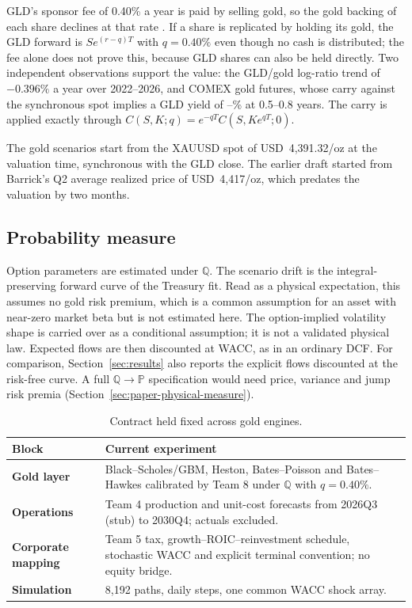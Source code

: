 GLD's sponsor fee of 0.40\% a year is paid by selling gold, so the gold backing of each share declines at that rate \citep{spdr2025}. If a share is replicated by holding its gold, the GLD forward is $S e^{(r-q)T}$ with $q=0.40\%$ even though no cash is distributed; the fee alone does not prove this, because GLD shares can also be held directly. Two independent observations support the value: the GLD/gold log-ratio trend of $-0.396\%$ a year over 2022--2026, and COMEX gold futures, whose carry against the synchronous spot implies a GLD yield of \FuturesYieldLow--\FuturesYieldHigh\% at 0.5--0.8 years. The carry is applied exactly through $C(S,K;q)=e^{-qT}C(S,Ke^{qT};0)$.

The gold scenarios start from the XAUUSD spot of USD~4,391.32/oz at the valuation time, synchronous with the GLD close. The earlier draft started from Barrick's Q2 average realized price of USD~4,417/oz, which predates the valuation by two months.

\subsection{Probability measure}
Option parameters are estimated under $\mathbb Q$. The scenario drift is the integral-preserving forward curve of the Treasury fit. Read as a physical expectation, this assumes no gold risk premium, which is a common assumption for an asset with near-zero market beta but is not estimated here. The option-implied volatility shape is carried over as a conditional assumption; it is not a validated physical law. Expected flows are then discounted at WACC, as in an ordinary DCF. For comparison, Section~\ref{sec:results} also reports the explicit flows discounted at the risk-free curve. A full $\mathbb Q\rightarrow\mathbb P$ specification would need price, variance and jump risk premia (Section~\ref{sec:paper-physical-measure}).

\begin{table}[H]
\centering
\caption{Contract held fixed across gold engines.}
\label{tab:frozen_contract}
\begin{tabularx}{\columnwidth}{@{}>{\bfseries}p{}X@{}}
\toprule
Block & Current experiment \\
\midrule
Gold layer & Black--Scholes/GBM, Heston, Bates--Poisson and Bates--Hawkes calibrated by Team 8 under $\mathbb Q$ with $q=0.40\%$. \\
Operations & Team 4 production and unit-cost forecasts from 2026Q3 (stub) to 2030Q4; actuals excluded. \\
Corporate mapping & Team 5 tax, growth--ROIC--reinvestment schedule, stochastic WACC and explicit terminal convention; no equity bridge. \\
Simulation & 8,192 paths, daily steps, one common WACC shock array. \\
\bottomrule
\end{tabularx}
\end{table}

